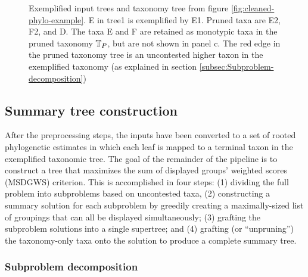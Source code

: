 \documentclass[fleqn,12pt,lineno,english]{wlpeerj}
\newcommand{\lyxdot}{.}
\begin{document}
\begin{figure}
\hfill{}\hfill{}

\caption{Exemplified input trees and taxonomy tree from figure \ref{fig:cleaned-phylo-example}.
E in tree1 is exemplified by E1. Pruned taxa are E2, F2, and D. The
taxa E and F are retained as monotypic taxa in the pruned taxonomy
$\protect\mbox{\ensuremath{\mathbb{T}}}_{P}$, but are not shown in panel c. The red
edge in the pruned taxonomy tree is an uncontested higher taxon in
the exemplified taxonomy (as explained in section \ref{subsec:Subproblem-decomposition})}
\label{fig:exemplify-example}
\end{figure}


\subsection{Summary tree construction}

After the preprocessing steps, the inputs have been converted to a
set of rooted phylogenetic estimates in which each leaf is mapped
to a terminal taxon in the exemplified taxonomic tree. The goal of
the remainder of the pipeline is to construct a tree that maximizes
the sum of displayed groups' weighted scores (MSDGWS) criterion. This is accomplished
in four steps: (1) dividing the full problem into subproblems based
on uncontested taxa, (2) constructing a summary solution for each
subproblem by greedily creating a maximally-sized list of groupings
that can all be displayed simultaneously; (3) grafting the subproblem
solutions into a single supertree; and (4) grafting (or ``unpruning'')
the taxonomy-only taxa onto the solution to produce a complete summary
tree.

\subsubsection{Subproblem decomposition\label{subsec:Subproblem-decomposition}}
\end{document}
